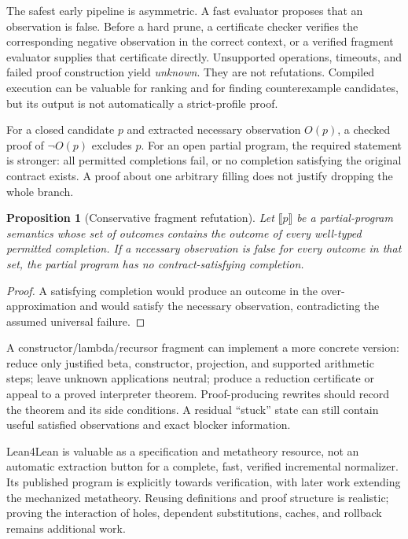 \documentclass[11pt,a4paper]{article}
\newtheorem{proposition}[theorem]{Proposition}
\theoremstyle{definition}
\theoremstyle{remark}
\begin{document}
The safest early pipeline is asymmetric. A fast evaluator proposes that an observation is false. Before a hard prune, a certificate checker verifies the corresponding negative observation in the correct context, or a verified fragment evaluator supplies that certificate directly. Unsupported operations, timeouts, and failed proof construction yield \emph{unknown}. They are not refutations. Compiled execution can be valuable for ranking and for finding counterexample candidates, but its output is not automatically a strict-profile proof.

For a closed candidate $p$ and extracted necessary observation $O(p)$, a checked proof of $\neg O(p)$ excludes $p$. For an open partial program, the required statement is stronger: all permitted completions fail, or no completion satisfying the original contract exists. A proof about one arbitrary filling does not justify dropping the whole branch.

\begin{proposition}[Conservative fragment refutation]\label{prop:fragment}
Let $\llbracket p\rrbracket$ be a partial-program semantics whose set of outcomes contains the outcome of every well-typed permitted completion. If a necessary observation is false for every outcome in that set, the partial program has no contract-satisfying completion.
\end{proposition}
\begin{proof}
A satisfying completion would produce an outcome in the over-approximation and would satisfy the necessary observation, contradicting the assumed universal failure.
\end{proof}

A constructor/lambda/recursor fragment can implement a more concrete version: reduce only justified beta, constructor, projection, and supported arithmetic steps; leave unknown applications neutral; produce a reduction certificate or appeal to a proved interpreter theorem. Proof-producing rewrites should record the theorem and its side conditions. A residual ``stuck'' state can still contain useful satisfied observations and exact blocker information.

Lean4Lean is valuable as a specification and metatheory resource, not an automatic extraction button for a complete, fast, verified incremental normalizer. Its published program is explicitly towards verification, with later work extending the mechanized metatheory.\cite{lean4lean,lean4lean2026} Reusing definitions and proof structure is realistic; proving the interaction of holes, dependent substitutions, caches, and rollback remains additional work.
\end{document}
